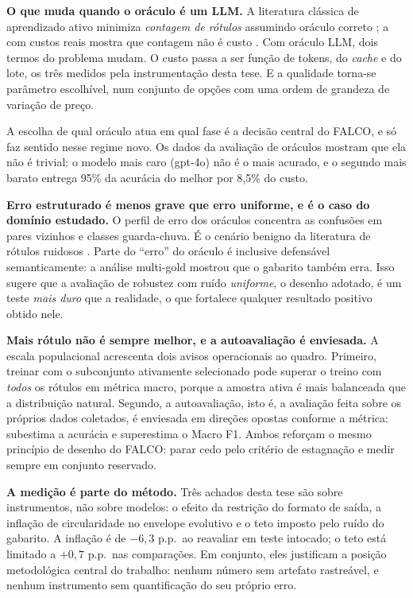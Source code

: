 \textbf{O que muda quando o oráculo é um LLM.} A literatura clássica de
aprendizado ativo minimiza \emph{contagem de rótulos} assumindo oráculo correto
\citep{Settles2012,Olsson2009}; a com custos reais mostra que contagem não é
custo \citep{SettlesCravenFriedland2008}. Com oráculo LLM, dois termos do problema
mudam. O custo passa a ser função de tokens, do \textit{cache} e do lote, os
três medidos pela instrumentação desta tese. E a qualidade torna-se parâmetro
escolhível, num conjunto de opções com uma ordem de grandeza de variação de
preço.

A escolha de qual oráculo atua em qual fase é a decisão central do FALCO, e só
faz sentido nesse regime novo. Os dados da avaliação de oráculos mostram que ela
não é trivial: o modelo mais caro (gpt-4o) não é o mais acurado, e o segundo
mais barato entrega 95\% da acurácia do melhor por 8,5\% do custo.

\textbf{Erro estruturado é menos grave que erro uniforme, e é o caso do
domínio estudado.}
O perfil de erro dos oráculos concentra as confusões em pares vizinhos e
classes guarda-chuva. É o cenário benigno da literatura de rótulos ruidosos
\citep{Frenay2014,Natarajan2013,Song2023NoisyLabels}. Parte do ``erro'' do
oráculo é inclusive defensável semanticamente: a análise multi-gold mostrou
que o gabarito também erra. Isso sugere que a avaliação de robustez com ruído
\emph{uniforme},
o desenho adotado, é um teste \emph{mais duro} que a realidade, o que fortalece
qualquer resultado positivo obtido nele.

\textbf{Mais rótulo não é sempre melhor, e a autoavaliação é enviesada.} A escala populacional acrescenta dois avisos operacionais ao quadro.
Primeiro, treinar com o subconjunto ativamente selecionado pode superar o
treino com \emph{todos} os rótulos em métrica macro, porque a amostra ativa é
mais balanceada que a distribuição natural. Segundo, a autoavaliação, isto é,
a avaliação feita sobre os próprios dados coletados, é enviesada em direções
opostas conforme a métrica: subestima a acurácia e superestima o Macro F1.
Ambos reforçam o mesmo princípio de desenho do FALCO: parar cedo pelo
critério de estagnação e medir sempre em conjunto reservado.

\textbf{A medição é parte do método.} Três achados desta tese são sobre instrumentos, não sobre modelos: o efeito
da restrição do formato de saída, a inflação de circularidade no envelope
evolutivo e o teto imposto pelo ruído do gabarito. A inflação é de $-6{,}3$ p.p.\ ao reavaliar
em teste intocado; o teto está limitado a $+0{,}7$ p.p.\ nas comparações. Em conjunto, eles justificam a posição metodológica central
do trabalho: nenhum número sem artefato rastreável, e nenhum instrumento sem
quantificação do seu próprio erro.

